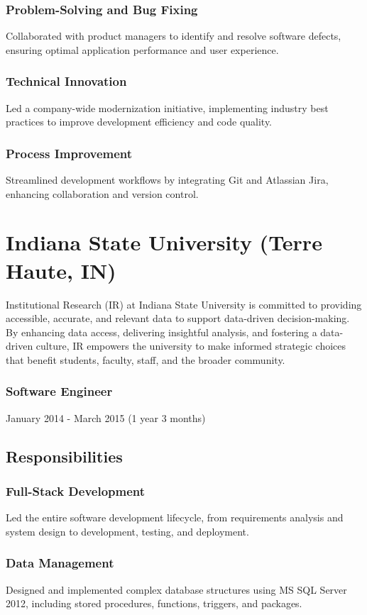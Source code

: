 \documentclass[letterpaper,9pt]{article}
\begin{document}
    \subsubsection{Problem-Solving and Bug Fixing}{Collaborated with product managers to identify and resolve software defects, ensuring optimal application performance and user experience.}
    \subsubsection{Technical Innovation}{Led a company-wide modernization initiative, implementing industry best practices to improve development efficiency and code quality.}
    \subsubsection{Process Improvement}{Streamlined development workflows by integrating Git and Atlassian Jira, enhancing collaboration and version control.}

    \pagebreak


    \section{Indiana State University (Terre Haute, IN)}{
	Institutional Research (IR) at Indiana State University is committed to providing accessible, accurate, and relevant data to support data-driven decision-making. By enhancing data access, delivering insightful analysis, and fostering a data-driven culture, IR empowers the university to make informed strategic choices that benefit students, faculty, staff, and the broader community.}
	\subsubsection{Software Engineer}{January 2014 - March 2015 (1 year 3 months)}
	\subsection{Responsibilities}
	\subsubsection{Full-Stack Development}{Led the entire software development lifecycle, from requirements analysis and system design to development, testing, and deployment.}
	\subsubsection{Data Management}{Designed and implemented complex database structures using MS SQL Server 2012, including stored procedures, functions, triggers, and packages.}
\end{document}
